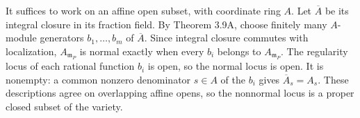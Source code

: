 It suffices to work on an affine open subset, with coordinate ring $A$. Let $\overline A$ be its integral closure in its fraction field. By Theorem 3.9A, choose finitely many $A$-module generators $b_1,\ldots,b_m$ of $\overline A$. Since integral closure commutes with localization, $A_{\mathfrak m_P}$ is normal exactly when every $b_i$ belongs to $A_{\mathfrak m_P}$. The regularity locus of each rational function $b_i$ is open, so the normal locus is open. It is nonempty: a common nonzero denominator $s\in A$ of the $b_i$ gives $\overline A_s=A_s$. These descriptions agree on overlapping affine opens, so the nonnormal locus is a proper closed subset of the variety.
